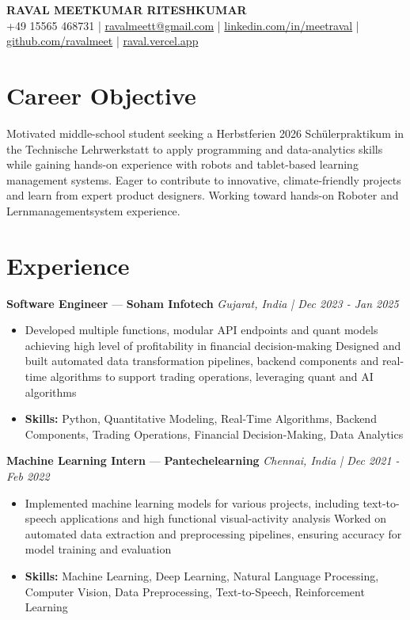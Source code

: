 \documentclass[a4paper,10pt]{article}
\begin{document}
\begin{center}
  {\Large\bfseries RAVAL MEETKUMAR RITESHKUMAR}\\[2pt]
  {\small +49 15565 468731 \;|\; \href{mailto:ravalmeett@gmail.com}{ravalmeett@gmail.com} \;|\; \href{https://www.linkedin.com/in/meetraval/}{linkedin.com/in/meetraval} \;|\; \href{https://github.com/ravalmeet}{github.com/ravalmeet} \;|\; \href{https://raval.vercel.app/}{raval.vercel.app}}
\end{center}
\vspace{-3pt}

\section*{Career Objective}
Motivated middle-school student seeking a Herbstferien 2026 Schülerpraktikum in the Technische Lehrwerkstatt to apply programming and data-analytics skills while gaining hands-on experience with robots and tablet-based learning management systems. Eager to contribute to innovative, climate-friendly projects and learn from expert product designers. Working toward hands-on Roboter and Lernmanagementsystem experience.\par

\section*{Experience}
\textbf{Software Engineer} — \textbf{Soham Infotech} \hfill \textit{Gujarat, India \;|\; Dec 2023 - Jan 2025}\par
\vspace{1pt}
\begin{itemize}
  \item Developed multiple functions, modular API endpoints and quant models achieving high level of profitability in financial decision-making Designed and built automated data transformation pipelines, backend components and real-time algorithms to support trading operations, leveraging quant and AI algorithms
  \item \textbf{Skills:} Python, Quantitative Modeling, Real-Time Algorithms, Backend Components, Trading Operations, Financial Decision-Making, Data Analytics
\end{itemize}
\vspace{3pt}
\textbf{Machine Learning Intern} — \textbf{Pantechelearning} \hfill \textit{Chennai, India \;|\; Dec 2021 - Feb 2022}\par
\vspace{1pt}
\begin{itemize}
  \item Implemented machine learning models for various projects, including text-to-speech applications and high functional visual-activity analysis Worked on automated data extraction and preprocessing pipelines, ensuring accuracy for model training and evaluation
  \item \textbf{Skills:} Machine Learning, Deep Learning, Natural Language Processing, Computer Vision, Data Preprocessing, Text-to-Speech, Reinforcement Learning
\end{itemize}
\end{document}
